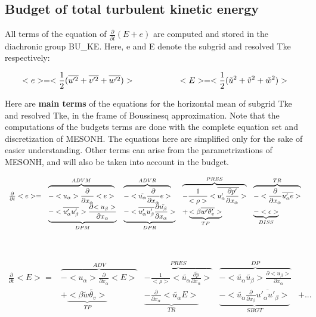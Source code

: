 \subsection{Budget of total turbulent kinetic energy}


All terms of the equation of $\frac{\partial}{\partial t} (E+e)$ are
computed and stored in the diachronic group BU\_KE. Here, e and E
denote the subgrid and resolved Tke respectively:

\begin{displaymath}
<e>=<\frac{1}{2}(\overline{u'^2}+\overline{v'^2}+\overline{w'^2})> \hspace*{2.cm}
<E>=<\frac{1}{2}(\tilde{u}^2+\tilde{v}^2+\tilde{w}^2)>
\end{displaymath}


Here are {\bf main terms} of the equations for the horizontal mean
of subgrid Tke and resolved Tke, in the
frame of Boussinesq approximation. Note that the computations of the budgets terms are done with the complete equation set and discretization of MESONH.
The equations here are simplified only for the sake of easier
understanding.
Other terms can arise
from the parametrizations of MESONH, and will also be taken into account
in the budget.

\begin{displaymath}
\begin{array}{rllll}
\frac{\partial }{\partial t} <e> = & 
\overbrace{- <u_\alpha>\frac{\partial}{\partial x_\alpha} <e> }^{ADVM} &
\overbrace{- <\tilde{u_\alpha}\frac{\partial}{\partial x_\alpha} e > }^{ADVR} &
\overbrace{- \frac{1}{<\rho>}<\overline{u'_\alpha \frac{\partial p'}{\partial x_\alpha}}>}^{PRES} &
\overbrace{- <\frac{\partial}{\partial x_\alpha} \overline{u'_\alpha e}>}^{TR}\\
\vspace*{1.2cm}
&\underbrace{- <\overline{u'_\alpha u'_\beta}> \frac{\partial {<u_\beta>}}{\partial x_\alpha}}_{DPM} &
\underbrace{- <\overline{u'_\alpha u'_\beta} \frac{\partial {\tilde{u_\beta}}}{\partial x_\alpha}>}_{DPR} &
+ \underbrace{<\beta  \overline{w'\theta'_v}>}_{TP} & 
\underbrace{- <\epsilon>}_{DISS}\\
\end{array}
\end{displaymath}
\begin{displaymath}
\begin{array}{rllll}
\frac{\partial }{\partial t} <E> = & 
\overbrace{- <u_\alpha>\frac{\partial}{\partial x_\alpha} <E> }^{ADV} &
\overbrace{- \frac{1}{<\rho>}<\tilde{u_\alpha} \frac{\partial \tilde{p}}{\partial x_\alpha}>}^{PRES} &
\overbrace{- <\tilde{u_\alpha} \tilde{u_\beta}> \frac{\partial {<u_\beta>}}{\partial x_\alpha}}^{DP} &\\
&+ \underbrace{<\beta  \tilde{w}\tilde{\theta_v}>}_{TP} &
 \underbrace{- \frac{\partial}{\partial x_\alpha} <\tilde{u_\alpha} E>}_{TR} &
\underbrace{- <\tilde{u_\alpha}\frac{\partial}{\partial x_\beta}\overline{u'_\alpha u'_\beta}>}_{SBGT}  &+ ...
\end{array}
\end{displaymath}


